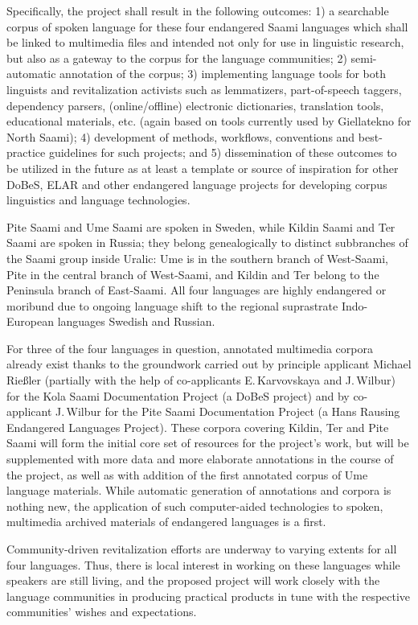 \documentclass[a4paper,12pt]{article}
\begin{document}
Specifically, the project shall result in the following outcomes: 1) a searchable corpus of spoken language for these four endangered Saami languages which shall be linked to multimedia files and intended not only %
for use in linguistic research, but also as a gateway to the corpus for the language communities; 2) semi-automatic annotation of the corpus; 3) implementing language tools for both linguists and revitalization activists such as lemmatizers, part-of-speech
  taggers, dependency parsers, %
 (online/offline) electronic dictionaries, translation tools, educational materials, etc. (again based on tools currently used by Giellatekno for North Saami); 4) development of methods, workflows, conventions and best-practice guidelines for such projects; and
5) dissemination of these outcomes to be utilized in the future as at least a template or source of inspiration for other DoBeS, ELAR and other endangered language projects for developing corpus linguistics and language technologies.

Pite Saami and Ume Saami are spoken in Sweden, while Kildin Saami and Ter Saami are spoken in Russia; they belong genealogically to distinct subbranches of the Saami group inside Uralic: Ume is in the southern branch of West-Saami, Pite in the central branch of West-Saami, and Kildin and Ter belong to the Peninsula branch of East-Saami. All four languages are highly endangered or moribund due to ongoing language shift to the regional suprastrate Indo-European languages Swedish and Russian.

For three of the four languages in question, annotated multimedia corpora already exist thanks to the groundwork carried out by principle applicant Michael Rießler (partially with the help of co-applicants E.\,Karvovskaya and J.\,Wilbur) for the Kola Saami Documentation Project (a DoBeS project) and by co-applicant J.\,Wilbur for the Pite Saami Documentation Project (a Hans Rausing Endangered Languages Project). These corpora covering Kildin, Ter and Pite Saami will form the initial core set of resources for the project's work, but will be supplemented with more data and more elaborate annotations in the course of the project, as well as with addition of the first annotated corpus of Ume language materials. While automatic generation of annotations and corpora is nothing new, the application of such computer-aided technologies to spoken, multimedia archived materials of endangered languages is a first.

Community-driven revitalization efforts are underway to varying extents for all four languages. Thus, there is local interest in working on these languages while speakers are still living, and the proposed project will work closely with the language communities in producing practical products in tune with the respective communities' wishes and expectations.
\end{document}
